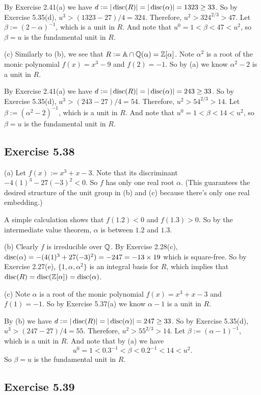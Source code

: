 \documentclass[../Marcus.tex]{subfiles}
\begin{document}
By Exercise 2.41(a) we have $d := |\operatorname{disc}(R)| = |\operatorname{disc}(\alpha)| = 1323 \geq 33$. So by Exercise 5.35(d), $u^3 > (1323-27)/4 = 324$. Therefore, $u^2 > 324^{2/3} > 47$. Let $\beta:=(2-\alpha)^{-1}$, which is a unit in $R$. And note that $u^0 = 1 < \beta < 47 < u^2$, so $\beta=u$ is the fundamental unit in $R$.

(c) Similarly to (b), we see that $R:= \mathbb{A}\cap\mathbb{Q}(\alpha) = \mathbb{Z}[\alpha]$. Note $\alpha^2$ is a root of the monic polynomial $f(x)=x^3-9$ and $f(2)=-1$. So by (a) we know $\alpha^2-2$ is a unit in $R$.

By Exercise 2.41(a) we have $d := |\operatorname{disc}(R)| = |\operatorname{disc}(\alpha)| = 243 \geq 33$. So by Exercise 5.35(d), $u^3 > (243-27)/4 = 54$. Therefore, $u^2 > 54^{2/3} > 14$. Let $\beta:=(\alpha^2-2)^{-1}$, which is a unit in $R$. And note that $u^0 = 1 < \beta < 14 < u^2$, so $\beta=u$ is the fundamental unit in $R$.

\subsection*{Exercise 5.38}

(a) Let $f(x):=x^3+x-3$. Note that its discriminant $-4(1)^3-27(-3)^2 < 0$. So $f$ has only one real root $\alpha$. (This guarantees the desired structure of the unit group in (b) and (c) because there's only one real embedding.)

A simple calculation shows that $f(1.2) < 0 $ and $f(1.3) > 0$. So by the intermediate value theorem, $\alpha$ is between $1.2$ and $1.3$.

(b) Clearly $f$ is irreducible over $\mathbb{Q}$. By Exercise 2.28(c), $\operatorname{disc}(\alpha) = -(4(1)^3+27(-3)^2) = -247 = -13\times 19$ which is square-free. So by Exercise 2.27(e), $\{1,\alpha,\alpha^2\}$ is an integral basis for $R$, which implies that $\operatorname{disc}(R) = \operatorname{disc}(\mathbb{Z}[\alpha]) = \operatorname{disc}(\alpha)$.

(c) Note $\alpha$ is a root of the monic polynomial $f(x)=x^3+x-3$ and $f(1)=-1$. So by Exercise 5.37(a) we know $\alpha-1$ is a unit in $R$.

By (b) we have $d := |\operatorname{disc}(R)| = |\operatorname{disc}(\alpha)| = 247 \geq 33$. So by Exercise 5.35(d), $u^3 > (247-27)/4 = 55$. Therefore, $u^2 > 55^{2/3} > 14$. Let $\beta:=(\alpha-1)^{-1}$, which is a unit in $R$. And note that by (a) we have
$$
u^0 = 1 < 0.3^{-1} < \beta < 0.2^{-1} < 14 < u^2.
$$
So $\beta=u$ is the fundamental unit in $R$.

\subsection*{Exercise 5.39}
\end{document}
